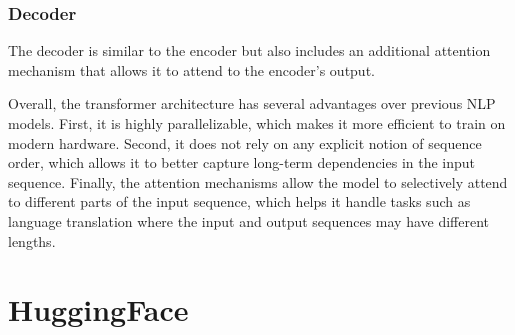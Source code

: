 \subsubsection{Decoder}

The decoder is similar to the encoder but also includes an additional attention mechanism that allows it to attend to the encoder's output.

Overall, the transformer architecture has several advantages over previous NLP models. First, it is highly parallelizable, which makes it more efficient to train on modern hardware. Second, it does not rely on any explicit notion of sequence order, which allows it to better capture long-term dependencies in the input sequence. Finally, the attention mechanisms allow the model to selectively attend to different parts of the input sequence, which helps it handle tasks such as language translation where the input and output sequences may have different lengths.

\section{HuggingFace}

